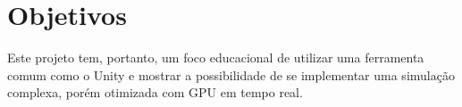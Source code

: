 \section{Objetivos}

Este projeto tem, portanto, um foco educacional de utilizar uma ferramenta comum como o Unity e mostrar a possibilidade de se implementar uma simulação complexa, porém otimizada com GPU em tempo real.
